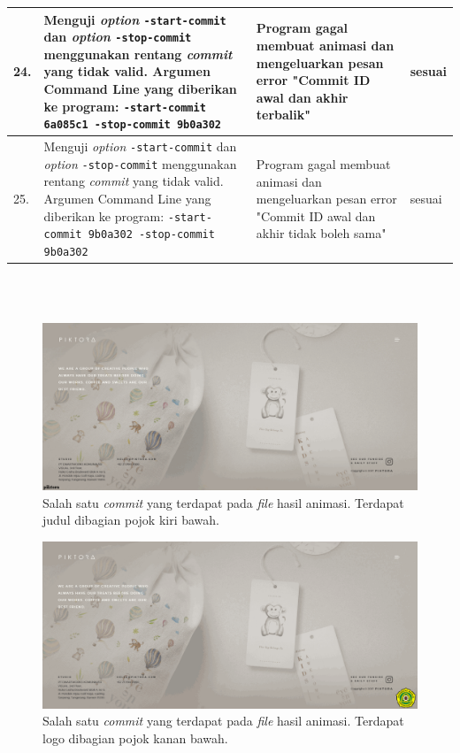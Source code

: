 \begin{table}[htbp]
\begin{tabular}{|p{0.3cm}|>{\raggedright} p{7 cm}| p{5.5 cm}| p{3 cm}|}
		24. & Menguji \textit{option} \texttt{-start-commit} dan \textit{option} \texttt{-stop-commit} menggunakan rentang \textit{commit} yang tidak valid. Argumen Command Line yang diberikan ke program: \texttt{-start-commit 6a085c1 -stop-commit 9b0a302} & Program gagal membuat animasi dan mengeluarkan pesan error "Commit ID awal dan akhir terbalik"  & sesuai\\ \hline
		25. & Menguji \textit{option} \texttt{-start-commit} dan \textit{option} \texttt{-stop-commit} menggunakan rentang \textit{commit} yang tidak valid. Argumen Command Line yang diberikan ke program: \texttt{-start-commit 9b0a302  -stop-commit 9b0a302} & Program gagal membuat animasi dan mengeluarkan pesan error "Commit ID awal dan akhir tidak boleh sama" & sesuai  \\ \hline
\end{tabular}
	\label{table:hasil_pengujian3}
\end{table}


\ \\
\ \\
\begin{figure}[H]
	\centering
		\includegraphics[scale=0.3]{Gambar/title.png}
	\caption{Salah satu \textit{commit} yang terdapat pada \textit{file} hasil animasi. Terdapat judul dibagian pojok kiri bawah.}
	\label{fig:title}
\end{figure}


\begin{figure}[H]
	\centering
		\includegraphics[scale=0.3]{Gambar/logo.png}
	\caption{Salah satu \textit{commit} yang terdapat pada \textit{file} hasil animasi. Terdapat logo dibagian pojok kanan bawah.}
	\label{fig:logo}
\end{figure}

